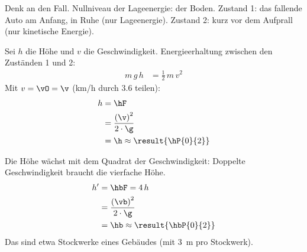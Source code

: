 Denk an den Fall. Nullniveau der Lageenergie: der Boden. Zustand 1: das fallende Auto am Anfang, in Ruhe (nur Lageenergie). Zustand 2: kurz vor dem Aufprall (nur kinetische Energie).

\begin{abcliste}
\abc
Sei $h$ die Höhe und $v$ die Geschwindigkeit. Energieerhaltung zwischen den Zuständen 1 und 2:
\begin{align}
 m\,g\,h &= \frac{1}{2}\,m\,v^2
\end{align}
Mit $v = \vO = \v$ (km/h durch 3.6 teilen):
\begin{align}
 h &= \hF \\
   &= \frac{\left(\v\right)^2}{2\cdot\g} \\
   &= \h \approx \result{\hP{0}{2}}
\end{align}

\abc
Die Höhe wächst mit dem Quadrat der Geschwindigkeit: Doppelte Geschwindigkeit braucht die vierfache Höhe.
\begin{align}
 h' &= \hbF = 4\,h \\
   &= \frac{\left(\vb\right)^2}{2\cdot\g} \\
   &= \hb \approx \result{\hbP{0}{2}}
\end{align}
Das sind etwa  Stockwerke eines Gebäudes (mit \SI{3}{\meter} pro Stockwerk).
\end{abcliste}

